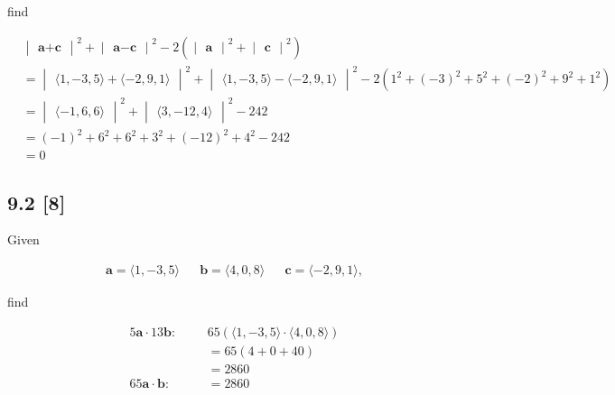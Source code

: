 \documentclass{article}
\begin{document}
find

\begin{align}
    &\begin{vmatrix}
    \textbf{a} + \textbf{c}
    \end{vmatrix}^2 + \begin{vmatrix}
    \textbf{a} - \textbf{c}
    \end{vmatrix}^2 -2 \left(\begin{vmatrix}
    \textbf{a}
    \end{vmatrix}^2 +\begin{vmatrix}
    \textbf{c}
    \end{vmatrix}^2 \right) 
    \\&= \begin{vmatrix}
    \langle1, -3, 5\rangle + \langle-2, 9, 1\rangle
    \end{vmatrix}^2 + \begin{vmatrix}
    \langle1, -3, 5\rangle - \langle-2, 9, 1\rangle
    \end{vmatrix}^2 -2 \left(1^2 + (-3)^2 + 5^2 + (-2)^2 + 9^2 +1^2\right)
    \\
    &=
    \begin{vmatrix}
    \langle-1, 6, 6\rangle
    \end{vmatrix}^2 + \begin{vmatrix}
    \langle3, -12, 4\rangle
    \end{vmatrix}^2 - 242
    \\
    &= (-1)^2 + 6^2 + 6^2 + 3^2 + (-12)^2 + 4^2 -242
    \\
    &= 0
\end{align}

\subsection*{9.2 [8]}
\setcounter{equation}{0}

Given

\begin{align}
    \textbf{a} = \langle1, -3, 5\rangle && \textbf{b} = \langle4, 0, 8\rangle && \textbf{c} = \langle-2, 9, 1\rangle,
\end{align}

find

\begin{align}
    5\textbf{a} \cdot 13\textbf{b}: && &\text{} 65\left( \langle1, -3, 5\rangle \cdot \langle4, 0, 8\rangle\right)
    \\
    && &= 65(4+0+40)
    \\
    && &= 2860
    \\
    65\textbf{a}\cdot\textbf{b}: && &= 2860
\end{align}
\end{document}
